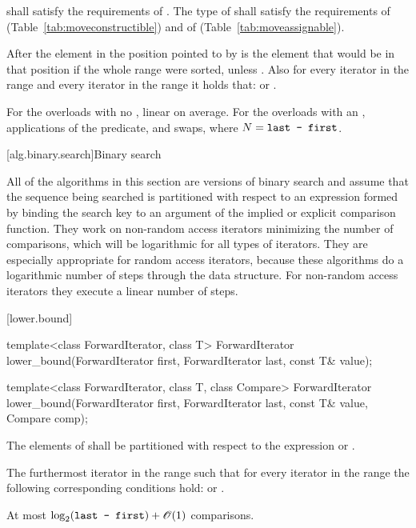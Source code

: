 \begin{itemdescr}
\pnum
\requires
{} shall satisfy the requirements of
. The type
of  shall satisfy the requirements of
 (Table~\ref{tab:moveconstructible}) and of
 (Table~\ref{tab:moveassignable}).

\pnum
\effects
After
the element in the position pointed to by 
is the element that would be
in that position if the whole range were sorted, unless .
Also for every iterator
in the range
and every iterator
in the range
it holds that:
or
.

\pnum
\complexity
For the overloads with no , linear on average.
For the overloads with an ,  applications of
the predicate, and  swaps, where $N = \texttt{last - first}$.
\end{itemdescr}

[alg.binary.search]{Binary search}

\pnum
All of the algorithms in this section are versions of binary search
and assume that the sequence being searched is partitioned with respect to
an expression formed by binding the search key to an argument of the
implied or explicit comparison function.
They work on non-random access iterators minimizing the number of comparisons,
which will be logarithmic for all types of iterators.
They are especially appropriate for random access iterators,
because these algorithms do a logarithmic number of steps
through the data structure.
For non-random access iterators they execute a linear number of steps.

[lower.bound]{}

%
\begin{itemdecl}
template<class ForwardIterator, class T>
  ForwardIterator
    lower_bound(ForwardIterator first, ForwardIterator last,
                const T& value);

template<class ForwardIterator, class T, class Compare>
  ForwardIterator
    lower_bound(ForwardIterator first, ForwardIterator last,
                const T& value, Compare comp);
\end{itemdecl}

\begin{itemdescr}
\pnum
\requires
The elements
of
shall be partitioned with respect to the expression
or
.

\pnum
\returns
The furthermost iterator
in the range
such that for every iterator
in the range
the following corresponding conditions hold:
or
.

\pnum
\complexity
At most
$\log_2(\texttt{last - first}) + \mathscr{O}(1)$
comparisons.
\end{itemdescr}


